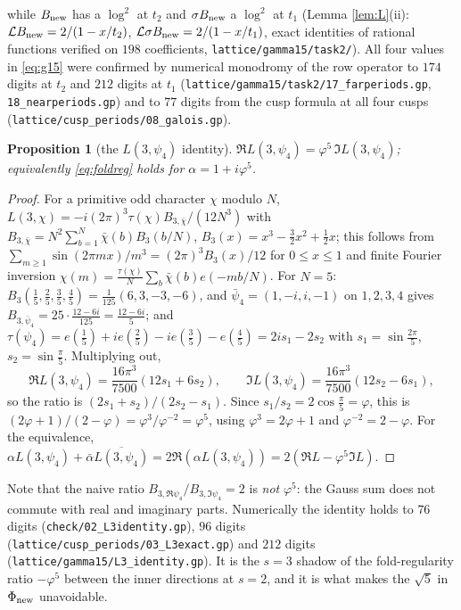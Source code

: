 \documentclass[11pt]{amsart}
\newtheorem{proposition}[theorem]{Proposition}
\theoremstyle{definition}
\theoremstyle{remark}
\newcommand{\Phinew}{\Phi_{\rm new}}\newcommand{\Phican}{\Phi_{\rm can}}
\begin{document}
while $B_{\rm new}$ has a $\log^2$ at $t_2$ and $\sigma B_{\rm new}$ a $\log^2$ at $t_1$ (Lemma \ref{lem:L}(ii): $\mathcal LB_{\rm new}=2/(1-x/t_2)$, $\mathcal L\sigma B_{\rm new}=2/(1-x/t_1)$, exact identities of rational functions verified on $198$ coefficients, \texttt{lattice/gamma15/task2/}). All four values in \eqref{eq:g15} were confirmed by numerical monodromy of the row operator to $174$ digits at $t_2$ and $212$ digits at $t_1$ (\texttt{lattice/gamma15/task2/17\_farperiods.gp}, \texttt{18\_nearperiods.gp}) and to $77$ digits from the cusp formula at all four cusps (\texttt{lattice/cusp\_periods/08\_galois.gp}).

\begin{proposition}[the $L(3,\psi_4)$ identity]\label{prop:L3}
$\Re L(3,\psi_4)=\varphi^5\,\Im L(3,\psi_4)$; equivalently \eqref{eq:foldreg} holds for $\alpha=1+i\varphi^5$.
\end{proposition}
\begin{proof}
For a primitive odd character $\chi$ modulo $N$, $L(3,\chi)=-i(2\pi)^3\tau(\chi)B_{3,\bar\chi}/(12N^3)$ with $B_{3,\bar\chi}=N^2\sum_{b=1}^N\bar\chi(b)B_3(b/N)$, $B_3(x)=x^3-\tfrac32x^2+\tfrac12x$; this follows from $\sum_{m\ge1}\sin(2\pi mx)/m^3=(2\pi)^3B_3(x)/12$ for $0\le x\le1$ and finite Fourier inversion $\chi(m)=\frac{\tau(\chi)}N\sum_b\bar\chi(b)e(-mb/N)$. For $N=5$: $B_3(\tfrac15,\tfrac25,\tfrac35,\tfrac45)=\frac1{125}(6,3,-3,-6)$, and $\bar\psi_4=(1,-i,i,-1)$ on $1,2,3,4$ gives $B_{3,\bar\psi_4}=25\cdot\frac{12-6i}{125}=\frac{12-6i}5$; and $\tau(\psi_4)=e(\tfrac15)+ie(\tfrac25)-ie(\tfrac35)-e(\tfrac45)=2is_1-2s_2$ with $s_1=\sin\frac{2\pi}5$, $s_2=\sin\frac\pi5$. Multiplying out,
$$\Re L(3,\psi_4)=\frac{16\pi^3}{7500}(12s_1+6s_2),\qquad \Im L(3,\psi_4)=\frac{16\pi^3}{7500}(12s_2-6s_1),$$
so the ratio is $(2s_1+s_2)/(2s_2-s_1)$. Since $s_1/s_2=2\cos\frac\pi5=\varphi$, this is $(2\varphi+1)/(2-\varphi)=\varphi^3/\varphi^{-2}=\varphi^5$, using $\varphi^3=2\varphi+1$ and $\varphi^{-2}=2-\varphi$. For the equivalence, $\alpha L(3,\psi_4)+\bar\alpha\overline{L(3,\psi_4)}=2\Re(\alpha L(3,\psi_4))=2(\Re L-\varphi^5\Im L)$.
\end{proof}
Note that the naive ratio $B_{3,\Re\psi_4}/B_{3,\Im\psi_4}=2$ is \emph{not} $\varphi^5$: the Gauss sum does not commute with real and imaginary parts. Numerically the identity holds to $76$ digits (\texttt{check/02\_L3identity.gp}), $96$ digits (\texttt{lattice/cusp\_periods/03\_L3exact.gp}) and $212$ digits (\texttt{lattice/gamma15/L3\_identity.gp}). It is the $s=3$ shadow of the fold-regularity ratio $-\varphi^5$ between the inner directions at $s=2$, and it is what makes the $\sqrt5$ in $\Phinew$ unavoidable.
\end{document}
